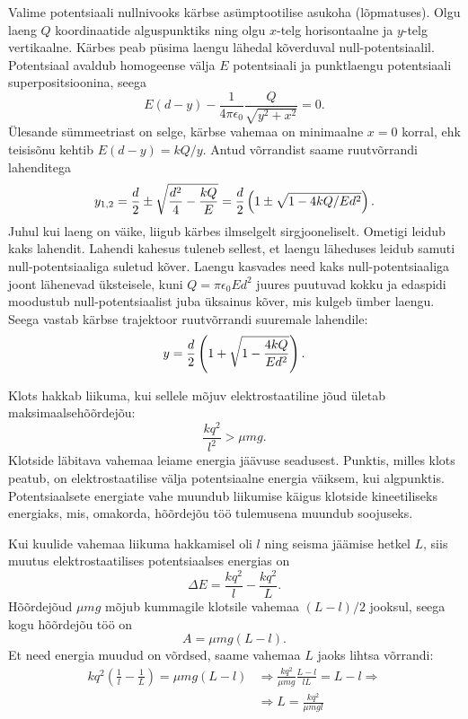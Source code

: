 \documentclass[10pt]{article}
\begin{document}
{%

\solu
Valime potentsiaali nullnivooks kärbse asümptootilise asukoha (lõpmatuses). 
Olgu laeng $Q$ koordinaatide alguspunktiks ning olgu $x$-telg horisontaalne ja $y$-telg vertikaalne. 
Kärbes peab püsima laengu lähedal kõverduval null-potentsiaalil. 
Potentsiaal avaldub homogeense välja $E$ potentsiaali ja punktlaengu potentsiaali superpositsioonina, seega 
\[
E(d - y) - \frac{1}{4\pi\epsilon_0}\frac{Q}{\sqrt{y^2 + x^2}} = 0.
\]
Ülesande sümmeetriast on selge, kärbse vahemaa on minimaalne $x=0$ korral, ehk teisisõnu kehtib $E(d-y) = kQ/y$. Antud võrrandist saame ruutvõrrandi lahenditega
\[
y_{1,2} = {d \over 2} \pm \sqrt{\frac {d^2}4 - {kQ \over E}} = {d \over 2}\left( 1 \pm \sqrt{1 - 4kQ / Ed^2}\right).
\] 
Juhul kui laeng on väike, liigub kärbes ilmselgelt sirgjooneliselt. Ometigi leidub kaks lahendit. Lahendi kahesus tuleneb sellest, et laengu läheduses leidub samuti
null-potentsiaaliga suletud kõver. Laengu kasvades need kaks null-potentsiaaliga joont lähenevad üksteisele, kuni $Q=\pi\epsilon_0Ed^2$ juures 
puutuvad kokku ja edaspidi moodustub null-potentsiaalist juba üksainus kõver, mis kulgeb ümber laengu. 
Seega vastab kärbse trajektoor ruutvõrrandi suuremale lahendile:
$$y= {d \over 2}\left(1 + \sqrt{1 - {4kQ \over Ed^2}}\right).$$
\probend
\bigskip


\solu
Klots hakkab liikuma, kui sellele mõjuv elektrostaatiline jõud ületab maksimaalsehõõrdejõu:
\[
\frac{kq^2}{l^2} > \mu mg.
\]
Klotside läbitava vahemaa leiame energia jäävuse seadusest. Punktis, milles klots peatub, on elektrostaatilise välja potentsiaalne energia väiksem, kui algpunktis. Potentsiaalsete energiate vahe muundub liikumise käigus klotside kineetiliseks energiaks, mis, omakorda, hõõrdejõu töö tulemusena muundub soojuseks.

Kui kuulide vahemaa liikuma hakkamisel oli $l$ ning seisma jäämise hetkel $L$, siis muutus elektrostaatilises potentsiaalses energias on
\[
\Delta E = \frac{kq^2}{l} - \frac{kq^2}{L}.
\]
Hõõrdejõud $\mu mg$ mõjub kummagile klotsile vahemaa $(L-l)/2$ jooksul, seega kogu
hõõrdejõu töö on
\[
A = \mu mg (L - l).
\]
Et need energia muudud on võrdsed, saame vahemaa $L$ jaoks lihtsa võrrandi:
\[
\begin{aligned}
k q^{2}\left(\frac{1}{l}-\frac{1}{L}\right)=\mu m g(L-l) &\Rightarrow \frac{k q^{2}}{\mu m g} \frac{L-l}{l L}=L-l \Rightarrow\\
&\Rightarrow L=\frac{k q^{2}}{\mu m g l}
\end{aligned}
\]
\probend
\bigskip

}
\end{document}
